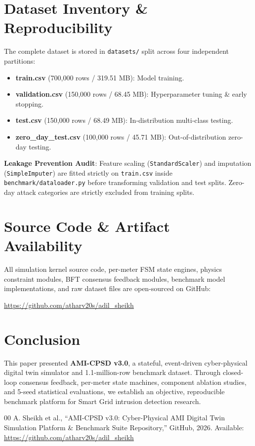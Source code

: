 \documentclass[conference]{IEEEtran}
\begin{document}
\section{Dataset Inventory \& Reproducibility}
\label{sec:reproducibility}

The complete dataset is stored in \texttt{datasets/} split across four independent partitions:
\begin{itemize}
    \item \textbf{train.csv} (700,000 rows / 319.51 MB): Model training.
    \item \textbf{validation.csv} (150,000 rows / 68.45 MB): Hyperparameter tuning \& early stopping.
    \item \textbf{test.csv} (150,000 rows / 68.49 MB): In-distribution multi-class testing.
    \item \textbf{zero\_day\_test.csv} (100,000 rows / 45.71 MB): Out-of-distribution zero-day testing.
\end{itemize}

\textbf{Leakage Prevention Audit}: Feature scaling (\texttt{StandardScaler}) and imputation (\texttt{SimpleImputer}) are fitted strictly on \texttt{train.csv} inside \texttt{benchmark/dataloader.py} before transforming validation and test splits. Zero-day attack categories are strictly excluded from training splits.

\section{Source Code \& Artifact Availability}
\label{sec:code_availability}
All simulation kernel source code, per-meter FSM state engines, physics constraint modules, BFT consensus feedback modules, benchmark model implementations, and raw dataset files are open-sourced on GitHub:
\begin{center}
\url{https://github.com/atharv20s/adil_sheikh}
\end{center}

\section{Conclusion}
\label{sec:conclusion}
This paper presented \textbf{AMI-CPSD v3.0}, a stateful, event-driven cyber-physical digital twin simulator and 1.1-million-row benchmark dataset. Through closed-loop consensus feedback, per-meter state machines, component ablation studies, and 5-seed statistical evaluations, we establish an objective, reproducible benchmark platform for Smart Grid intrusion detection research.

\begin{thebibliography}{00}
 A. Sheikh et al., ``AMI-CPSD v3.0: Cyber-Physical AMI Digital Twin Simulation Platform \& Benchmark Suite Repository,'' GitHub, 2026. Available: \url{https://github.com/atharv20s/adil_sheikh}
\end{thebibliography}
\end{document}

